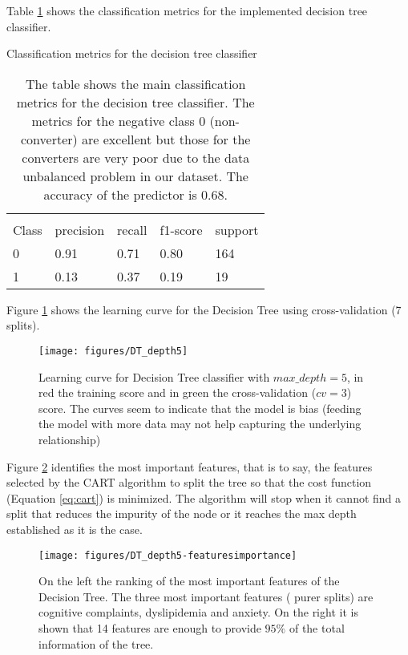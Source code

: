 \documentclass[11pt]{article}
\theoremstyle{definition}
\theoremstyle{remark}
\begin{document}
Table \ref{tab:dectree} shows the classification metrics for the implemented decision tree classifier.

\begin{table}[H]
\caption{Classification metrics for the decision tree classifier}
\begin{center} 
\begin{tabular}{lllll}
\hline
\multicolumn{1}{c}{} \\
Class & precision & recall & f1-score & support     \\
\hline
0 & 0.91 &  0.71  &  0.80  & 164 \\
1 & 0.13 &  0.37  &  0.19  & 19  \\
\hline
\end{tabular}
\caption{The table shows the main classification metrics for the decision tree classifier. The metrics for the negative class 0 (non-converter) are excellent but those for the converters are very poor due to the data unbalanced problem in our dataset. The accuracy of the predictor is 0.68.
}  \label{tab:dectree} 
\end{center}
\end{table}


Figure \ref{fig:dt-md5-learning} shows the learning curve for the Decision Tree using cross-validation (7 splits). 
\begin{figure}[H]
        \centering
        \texttt{[image: figures/DT\_depth5]}
        \caption{Learning curve for Decision Tree classifier with $max\_depth=5$, in red the training score and in green the cross-validation ($cv=3$) score. The curves seem to indicate that the model is bias (feeding the model with more data may not help capturing the underlying relationship)
        } \label{fig:dt-md5-learning}
\end{figure}

Figure \ref{fig:dt-md5-features} identifies the most important features, that is to say, the features selected by the CART algorithm to split the tree so that the cost function (Equation \ref{eq:cart}) is minimized. The algorithm will stop when it cannot find a split that reduces the impurity of the node or it reaches the max depth established as it is the case.
\begin{figure}[H]
        \centering
        \texttt{[image: figures/DT\_depth5-featuresimportance]}
        \caption{On the left the ranking of the most important features of the Decision Tree. The three most important features ( purer splits) are cognitive complaints, dyslipidemia and anxiety. On the right it is shown that 14 features are enough to provide $95\%$ of the total information of the tree.   
        } \label{fig:dt-md5-features}
\end{figure}
\end{document}
